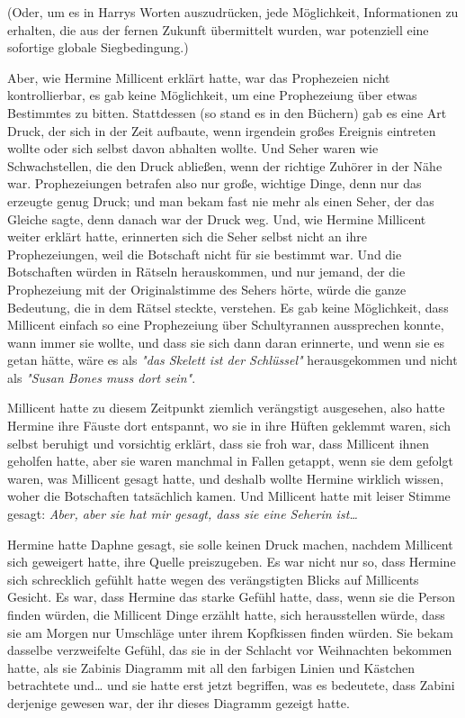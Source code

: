 {(Oder, um es in Harrys Worten auszudrücken, jede Möglichkeit, Informationen zu erhalten, die aus der fernen Zukunft übermittelt wurden, war potenziell eine sofortige globale Siegbedingung.)

Aber, wie Hermine Millicent erklärt hatte, war das Prophezeien nicht kontrollierbar, es gab keine Möglichkeit, um eine Prophezeiung über etwas Bestimmtes zu bitten. Stattdessen (so stand es in den Büchern) gab es eine Art Druck, der sich in der Zeit aufbaute, wenn irgendein großes Ereignis eintreten wollte oder sich selbst davon abhalten wollte. Und Seher waren wie Schwachstellen, die den Druck abließen, wenn der richtige Zuhörer in der Nähe war. Prophezeiungen betrafen also nur große, wichtige Dinge, denn nur das erzeugte genug Druck; und man bekam fast nie mehr als einen Seher, der das Gleiche sagte, denn danach war der Druck weg. Und, wie Hermine Millicent weiter erklärt hatte, erinnerten sich die Seher selbst nicht an ihre Prophezeiungen, weil die Botschaft nicht für sie bestimmt war. Und die Botschaften würden in Rätseln herauskommen, und nur jemand, der die Prophezeiung mit der Originalstimme des Sehers hörte, würde die ganze Bedeutung, die in dem Rätsel steckte, verstehen. Es gab keine Möglichkeit, dass Millicent einfach so eine Prophezeiung über Schultyrannen aussprechen konnte, wann immer sie wollte, und dass sie sich dann daran erinnerte, und wenn sie es getan hätte, wäre es als \emph{"das Skelett ist der Schlüssel"} herausgekommen und nicht als \emph{"Susan Bones muss dort sein"}.

Millicent hatte zu diesem Zeitpunkt ziemlich verängstigt ausgesehen, also hatte Hermine ihre Fäuste dort entspannt, wo sie in ihre Hüften geklemmt waren, sich selbst beruhigt und vorsichtig erklärt, dass sie froh war, dass Millicent ihnen geholfen hatte, aber sie waren manchmal in Fallen getappt, wenn sie dem gefolgt waren, was Millicent gesagt hatte, und deshalb wollte Hermine wirklich wissen, woher die Botschaften tatsächlich kamen. Und Millicent hatte mit leiser Stimme gesagt: \emph{Aber, aber sie hat mir gesagt, dass sie eine Seherin ist…}

Hermine hatte Daphne gesagt, sie solle keinen Druck machen, nachdem Millicent sich geweigert hatte, ihre Quelle preiszugeben. Es war nicht nur so, dass Hermine sich schrecklich gefühlt hatte wegen des verängstigten Blicks auf Millicents Gesicht. Es war, dass Hermine das starke Gefühl hatte, dass, wenn sie die Person finden würden, die Millicent Dinge erzählt hatte, sich herausstellen würde, dass sie am Morgen nur Umschläge unter ihrem Kopfkissen finden würden. Sie bekam dasselbe verzweifelte Gefühl, das sie in der Schlacht vor Weihnachten bekommen hatte, als sie Zabinis Diagramm mit all den farbigen Linien und Kästchen betrachtete und… und sie hatte erst jetzt begriffen, was es bedeutete, dass Zabini derjenige gewesen war, der ihr dieses Diagramm gezeigt hatte.

}
